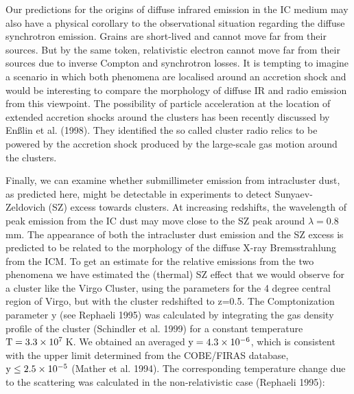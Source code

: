 \documentclass[]{aa}
\begin{document}
Our predictions for the origins of diffuse infrared emission in the IC medium
may also have a physical corollary to the observational situation regarding the
diffuse synchrotron emission. Grains are short-lived and cannot move far from
their sources. But by the same token, relativistic electron cannot move far 
from their sources due to inverse Compton and synchrotron losses. It is 
tempting to imagine a scenario in which both phenomena are localised around 
an accretion shock and would be interesting to compare the morphology of 
diffuse IR and radio emission from this viewpoint. The possibility of particle
acceleration at the location of extended accretion shocks around the clusters
has been recently discussed by En{\ss}lin et
al. (1998). They identified the so called cluster radio relics to be powered by
the accretion shock produced by the large-scale gas motion around the clusters.


Finally, we can examine whether submillimeter emission
from intracluster dust, as predicted here, might be detectable 
in experiments to detect Sunyaev-Zeldovich (SZ) excess towards
clusters. At increasing redshifts, the wavelength of peak emission
from the IC dust may move close to the SZ peak around $\lambda=0.8$\,mm.
The appearance of both the intracluster dust emission and the SZ
excess is predicted to be related to the morphology of the diffuse X-ray
Bremsstrahlung from the ICM. To get an estimate for the relative
emissions from the two phenomena we have estimated the (thermal)
SZ effect that we would observe for a cluster
like the Virgo Cluster, using the parameters for the 4 degree central 
region of Virgo, but with the cluster redshifted to z=0.5. The Comptonization 
parameter y (see Rephaeli 1995) was calculated by integrating the
gas density profile of the cluster (Schindler et al. 1999) for a constant 
temperature
${\rm T}=3.3\times 10^7$\,K. We obtained an averaged 
${\rm y}=4.3\times 10^{-6}$, which is consistent
with the upper limit determined from the COBE/FIRAS database, 
${\rm y}\leq 2.5\times 10^{-5}$ (Mather et al. 1994). The corresponding
temperature change due to the scattering was calculated in the non-relativistic
case (Rephaeli 1995):
\end{document}
